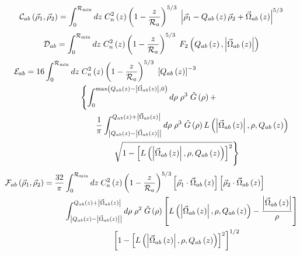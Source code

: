 \begin{equation}\label{caliph_C}
\mathcal{C}_{ab}\left(\vec{\rho}_{1}, \vec{\rho}_{2}\right) = 
\int_{0}^{\mathcal{R}_{\rm min}} dz \; C_{n}^{2}\left(z\right) \left( 1 - \frac{z}{\mathcal{R}_{a}}\right)^{5/3}\; 
\left\vert\vec{\rho}_{1} - Q_{ab}\left(z\right)\vec{\rho}_{2} + \vec{\Omega}_{ab}\left(z\right)\right\vert^{5/3}
\end{equation}
\begin{equation}\label{caliph_D}
\mathcal{D}_{ab} = 
\int_{0}^{\mathcal{R}_{\rm min}} dz \; C_{n}^{2}\left(z\right) \left( 1 - \frac{z}{\mathcal{R}_{a}}\right)^{5/3}\; 
F_{2}\left(Q_{ab}\left(z\right),\left\vert\vec{\Omega}_{ab}\left(z\right)\right\vert\right)
\end{equation}
\begin{equation}\label{caliph_E}
\begin{split}
\mathcal{E}_{ab} = 
16 \int_{0}^{\mathcal{R}_{\rm min}} dz & \; C_{n}^{2}\left(z\right) \left( 1 - \frac{z}{\mathcal{R}_{a}}\right)^{5/3}\; 
\left[Q_{ab}\left(z\right)\right]^{-3}
\\ 
& \left\{\int_{0}^{{\rm max}\left(Q_{ab}\left(z\right)-\left\vert \vec{\Omega}_{ab} \left(z\right)\right\vert,0\right)} d\rho \; \rho^{3} \; \hat{G}\left(\rho\right) + 
\right.
\\ 
& 
\quad\quad
\frac{1}{\pi} \int^{Q_{ab}\left(z\right)+\left\vert \vec{\Omega}_{ab}\left(z\right)\right\vert}_{\left\vert Q_{ab}\left(z\right)-\left\vert \vec{\Omega}_{ab}\left(z\right)\right\vert\right\vert}
d\rho \; \rho^{3} \; \hat{G}\left(\rho\right) L\left(\left\vert\vec{\Omega}_{ab}\left(z\right)\right\vert, \rho, Q_{ab}\left(z\right)\right) \\
& 
\quad\quad\quad\quad
\left.
\sqrt{1 - \left[L\left(\left\vert\vec{\Omega}_{ab}\left(z\right)\right\vert, \rho, Q_{ab}\left(z\right)\right)\right]^{2}}
\vphantom{\int_{0}^{{\rm max}\left(Q_{ab}\left(z\right)-\left\vert \vec{\Omega}_{ab} \left(z\right)\right\vert,0\right)}}
\right\} 
\end{split}
\end{equation}
\begin{equation}\label{caliph_F}
\begin{split}
\mathcal{F}_{ab}\left(\vec{\rho}_{1}, \vec{\rho}_{2}\right) = 
\frac{32}{\pi}& \int_{0}^{\mathcal{R}_{\rm min}} dz \; C_{n}^{2}\left(z\right) \left( 1 - \frac{z}{\mathcal{R}_{a}}\right)^{5/3}
\left[\vec{\rho}_{1} \cdot \vec{\Omega}_{ab}\left(z\right) \right]
\left[\vec{\rho}_{2} \cdot \vec{\Omega}_{ab}\left(z\right) \right] \\
&
\int^{Q_{ab}\left(z\right)+\left\vert \vec{\Omega}_{ab}\left(z\right)\right\vert}_{\left\vert Q_{ab}\left(z\right)-\left\vert \vec{\Omega}_{ab}\left(z\right)\right\vert\right\vert}
d\rho \; \rho^{2} \; \hat{G}\left(\rho\right) 
\left[L\left(\left\vert\vec{\Omega}_{ab}\left(z\right)\right\vert, \rho, Q_{ab}\left(z\right)\right) - \frac{\left\vert \vec{\Omega}_{ab}\left(z\right) \right\vert}{\rho}\right]\\
& 
\quad\quad\quad\quad\quad\quad
\left[1 - \left[L\left(\left\vert\vec{\Omega}_{ab}\left(z\right)\right\vert, \rho, Q_{ab}\left(z\right)\right)\right]^{2}\right]^{1/2}
\end{split}
\end{equation}
